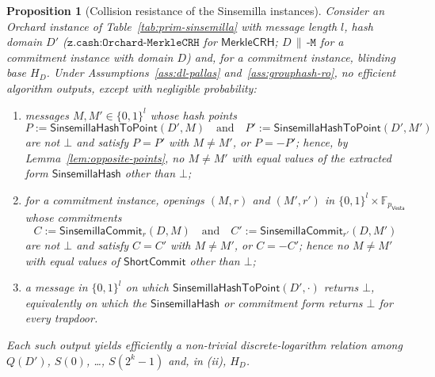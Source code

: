 \documentclass[11pt,a4paper]{article}
\newtheorem{proposition}[theorem]{Proposition}
\theoremstyle{definition}
\newcommand{\F}{\mathbb{F}}
\newcommand{\Vesta}{\ensuremath{\mathsf{Vesta}}}
\newcommand{\ShortCommit}{\ensuremath{\mathsf{ShortCommit}}}
\begin{document}
\begin{proposition}[Collision resistance of the Sinsemilla instances]%
\label{prop:sinsemilla-cr}
Consider an Orchard instance of Table~\ref{tab:prim-sinsemilla} with
message length $l$, hash domain $D'$ ($\texttt{z.cash:Orchard-MerkleCRH}$ for
$\mathsf{MerkleCRH}$; $D \,\|\, \texttt{-M}$ for a commitment instance with
domain $D$) and, for a commitment instance, blinding base $H_D$. Under
Assumptions~\ref{ass:dl-pallas} and~\ref{ass:grouphash-ro}, no efficient
algorithm outputs, except with negligible probability:
\begin{enumerate}
\item[(i)] messages $M, M' \in \{0,1\}^l$ whose hash points
  \[
    P := \mathsf{SinsemillaHashToPoint}(D', M) \quad\text{and}\quad
    P' := \mathsf{SinsemillaHashToPoint}(D', M')
  \]
  are not $\bot$ and satisfy
  $P = P'$ with $M \neq M'$, or $P = -P'$; hence, by
  Lemma~\ref{lem:opposite-points}, no $M \neq M'$ with equal values of the
  extracted form $\mathsf{SinsemillaHash}$ other than $\bot$;
\item[(ii)] for a commitment instance, openings $(M, r)$ and $(M', r')$ in
  $\{0,1\}^l \times \F_{p_{\Vesta}}$ whose commitments
  \[
    C := \mathsf{SinsemillaCommit}_r(D, M) \quad\text{and}\quad
    C' := \mathsf{SinsemillaCommit}_{r'}(D, M')
  \]
  are not $\bot$ and satisfy
  $C = C'$ with $M \neq M'$, or $C = -C'$; hence no $M \neq M'$ with equal
  values of $\ShortCommit$ other than $\bot$;
\item[(iii)] a message in $\{0,1\}^l$ on which
  $\mathsf{SinsemillaHashToPoint}(D', \cdot)$ returns $\bot$, equivalently
  on which the $\mathsf{SinsemillaHash}$ or commitment form returns $\bot$
  for every trapdoor.
\end{enumerate}
Each such output yields efficiently a non-trivial discrete-logarithm
relation among $Q(D')$, $S(0)$, \dots, $S(2^k - 1)$ and, in (ii), $H_D$.
\end{proposition}
\end{document}
